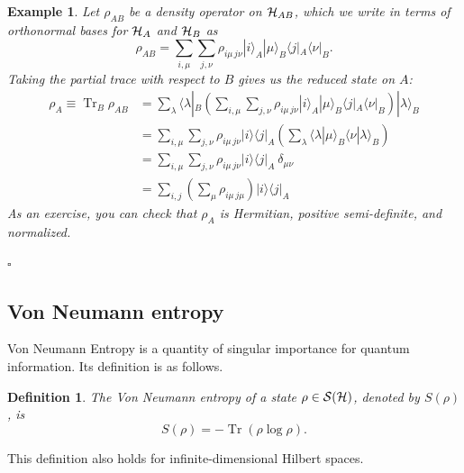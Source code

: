 \documentclass[a4paper,11pt]{article}
\newtheorem{defn}[thm]{Definition}
\newtheorem{example}[thm]{Example}
\newenvironment{eg}{\begin{example}  \rm  }{    \end{example} }
\newcommand{\eop}{{\hspace*{\fill}$\square$}}
\DeclareMathOperator{\Tr}{Tr}
\newcommand{\bra}[1]{\langle #1|}
\newcommand{\ket}[1]{|#1\rangle}
\newcommand{\braket}[2]{\langle #1|#2\rangle}
\newcommand{\ketbra}[2]{| #1 \rangle \langle #2 |}
\newcommand{\Hil}{{\cal H}}
\newcommand{\Note}{\noindent {\bf Note:~}}
\begin{document}
\begin{eg}
Let $\rho_{AB}$ be a density operator on $\Hil_{AB}$, which we write in terms of orthonormal bases for $\Hil_A$ and $\Hil_B$ as
\begin{equation}
\rho_{AB} = \sum_{i, \mu} \sum_{j, \nu} \rho_{i\mu \, j\nu} \ket{i}_A\ket{\mu}_B \bra{j}_A \bra{\nu}_B .
\end{equation}
Taking the partial trace with respect to $B$ gives us the reduced state on $A$:
\begin{align*}
\rho_A \equiv \Tr_B \rho_{AB} &= \sum_{\lambda} \bra{\lambda}_B \left( \sum_{i, \mu} \sum_{j, \nu} \rho_{i\mu \, j\nu} \ket{i}_A\ket{\mu}_B \bra{j}_A \bra{\nu}_B \right) \ket{\lambda}_B \\
&= \sum_{i , \mu} \sum_{j , \nu} \rho_{i\mu \, j\nu} \ketbra{i}{j}_A \left( \sum_\lambda \braket{\lambda}{\mu}_B \braket{\nu}{\lambda}_B \right) \\
&= \sum_{i , \mu} \sum_{j , \nu} \rho_{i\mu \, j\nu} \ketbra{i}{j}_A ~ \delta_{\mu\nu} \\
&= \sum_{i,j} \left(\sum_{\mu} \rho_{i\mu \, j \mu} \right) \ketbra{i}{j}_A
\end{align*}
As an exercise, you can check that $\rho_A$ is Hermitian, positive semi-definite, and normalized.

\eop
\end{eg}


\subsection{Von Neumann entropy}

Von Neumann Entropy is a quantity of singular importance for quantum information.
Its definition is as follows.

\begin{defn}
The \emph{Von Neumann entropy} of a state $\rho \in \mathcal{S}(\Hil)$, denoted by $S(\rho)$, is
\begin{equation}
S(\rho) = - \Tr \left( \rho \log \rho \right).
\end{equation}
\end{defn}
\Note This definition also holds for infinite-dimensional Hilbert spaces.

~
\end{document}
